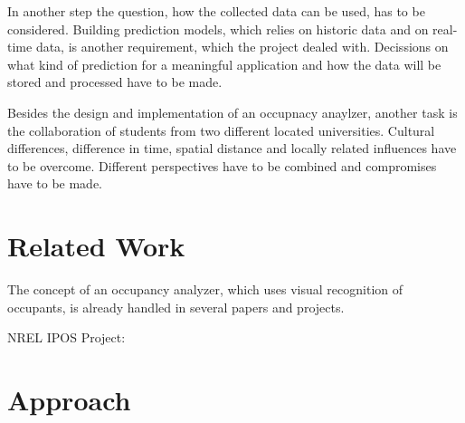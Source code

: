 In another step the question, how the collected data can be used, has to be considered. Building prediction models, which relies on historic data and on real-time data, is another requirement, which the project dealed with. Decissions on what kind of prediction for a meaningful application and how the data will be stored and processed have to be made.

Besides the design and implementation of an occupnacy anaylzer, another task is the collaboration of students from two different located universities. Cultural differences, difference in time, spatial distance and locally related influences have to be overcome. Different perspectives have to be combined and compromises have to be made.


\section{Related Work}


The concept of an occupancy analyzer, which uses visual recognition of occupants, is already handled in several papers and projects.


NREL IPOS Project:





\section{Approach}

